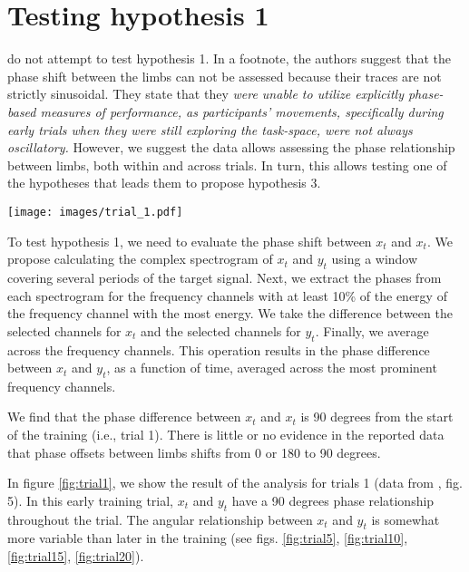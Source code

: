 \documentclass[11pt]{article}
\newcommand{\myquote}[1]{\textit{#1}}
\newcommand{\fg}[1]{\citet{Annand2020}, fig. #1}
\begin{document}
\section{Testing hypothesis 1}

\citet{Annand2020} do not attempt to test hypothesis 1. In a footnote, the authors suggest that the phase shift between the limbs can not be assessed because their traces are not strictly sinusoidal. They state that they \myquote{were unable to utilize explicitly phase-based measures of performance, as participants' movements, specifically during early trials when they were still exploring the task-space, were not always oscillatory.} However, we suggest the data allows assessing the phase relationship between limbs, both within and across trials. In turn, this allows testing one of the hypotheses that leads them to propose hypothesis 3. 

\begin{figure*}[htb]
	\centering
	\texttt{[image: images/trial\_1.pdf]}
	\caption{Analysis of trial 1 (Data from \fg{5}). (a) The $x_t$ and $y_t$ traces. (b,c) The magnitude spectra of $x_t$ and $y_t$. The red line indicates the target frequency set by \citet{Annand2020}. (d) The frequency-average phase shift as a function of time. The horizontal lines indicate 180 and 90 degree phase shifts.}
	\label{fig:trial1}
\end{figure*}


To test hypothesis 1, we need to evaluate the phase shift between $x_t$ and $x_t$. We propose calculating the complex spectrogram of $x_t$ and $y_t$ using a window covering several periods of the target signal. Next, we extract the phases from each spectrogram for the frequency channels with at least 10\% of the energy of the frequency channel with the most energy. We take the difference between the selected channels for $x_t$ and the selected channels for $y_t$. Finally, we average across the frequency channels. This operation results in the phase difference between $x_t$ and $y_t$, as a function of time, averaged across the most prominent frequency channels.

We find that the phase difference between $x_t$ and $x_t$ is 90 degrees from the start of the training (i.e.,  trial 1). There is little or no evidence in the reported data that phase offsets between limbs shifts from 0 or 180 to 90 degrees. 

In figure \ref{fig:trial1}, we show the result of the analysis for trials 1 (data from \fg{5}). In this early training trial, $x_t$ and $y_t$ have a 90 degrees phase relationship throughout the trial. The angular relationship between $x_t$ and $y_t$ is somewhat more variable than later in the training (see figs. \ref{fig:trial5}, \ref{fig:trial10}, \ref{fig:trial15}, \ref{fig:trial20}).
\end{document}
